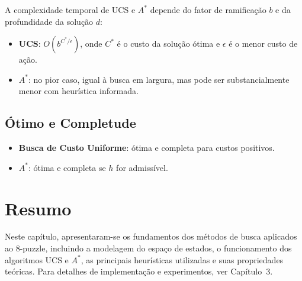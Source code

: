 A complexidade temporal de UCS e $A^*$ depende do fator de ramificação $b$ e da profundidade da solução $d$:  
\begin{itemize}  
    \item \textbf{UCS}: $O(b^{C^*/\epsilon})$, onde $C^*$ é o custo da solução ótima e $\epsilon$ é o menor custo de ação.  
    \item \textbf{$A^*$}: no pior caso, igual à busca em largura, mas pode ser substancialmente menor com heurística informada.  
\end{itemize}  
  
\subsection{Ótimo e Completude}  
  
\begin{itemize}  
    \item \textbf{Busca de Custo Uniforme}: ótima e completa para custos positivos.  
    \item \textbf{$A^*$}: ótima e completa se $h$ for admissível.  
\end{itemize}  
  
\section{Resumo}  
  
Neste capítulo, apresentaram-se os fundamentos dos métodos de busca aplicados ao 8-puzzle, incluindo a modelagem do espaço de estados, o funcionamento dos algoritmos UCS e $A^*$, as principais heurísticas utilizadas e suas propriedades teóricas. Para detalhes de implementação e experimentos, ver Capítulo~3.  
  
